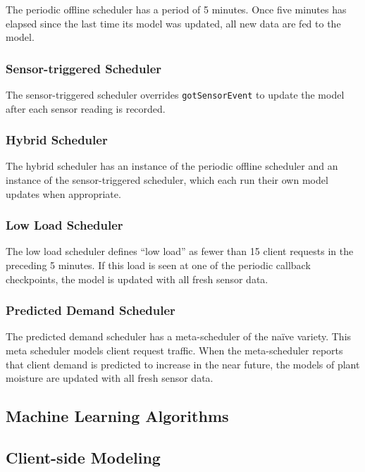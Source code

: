 \documentclass[a4paper]{acm_proc_article-sp}
\begin{document}
The periodic offline scheduler has a period of 5 minutes.  Once five minutes has elapsed since the last time its model was updated, all new data are fed to the model.

\subsubsection{Sensor-triggered Scheduler}

The sensor-triggered scheduler overrides \lstinline|gotSensorEvent| to update the model after each sensor reading is recorded.

\subsubsection{Hybrid Scheduler}

The hybrid scheduler has an instance of the periodic offline scheduler and an instance of the sensor-triggered scheduler, which each run their own model updates when appropriate.

\subsubsection{Low Load Scheduler}

The low load scheduler defines ``low load'' as fewer than 15 client requests in the preceding 5 minutes.  If this load is seen at one of the periodic callback checkpoints, the model is updated with all fresh sensor data.

\subsubsection{Predicted Demand Scheduler}

The predicted demand scheduler has a meta-scheduler of the na\"{i}ve variety.  This meta scheduler models client request traffic.  When the meta-scheduler reports that client demand is predicted to increase in the near future, the models of plant moisture are updated with all fresh sensor data.

\subsection{Machine Learning Algorithms}

\subsection{Client-side Modeling}
\end{document}
